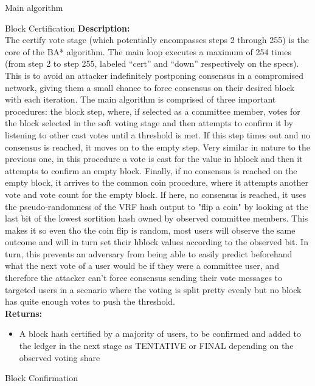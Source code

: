 \documentclass[10pt,a4paper]{article}
\begin{document}
\begin{section}{Main algorithm}
\begin{subsection}{Block Certification}
\noindent \textbf{Description:}\\
The certify vote stage (which potentially encompasses steps 2 through 255) is the core of the BA* algorithm.
The main loop executes a maximum of 254 times (from step 2 to step 255, labeled ``cert'' and ``down'' 
respectively on the specs).
This is to avoid an attacker indefinitely postponing consensus in a compromised network, giving them a 
small chance to force consensus on their desired block with each iteration.
The main algorithm is comprised of three important procedures: the block step, where, if selected as a 
committee member, votes for the block selected in the soft voting stage and then attempts to confirm it 
by listening to other cast votes until a threshold is met.
If this step times out and no consensus is reached, it moves on to the empty step. Very similar in nature 
to the previous one, in this procedure a vote is cast for the value in hblock and then it attempts to 
confirm an empty block.
Finally, if no consensus is reached on the empty block, it arrives to the common coin procedure, where 
it attempts another vote and vote count for the empty block. If here, no consensus is reached, it uses 
the pseudo-randomness of the VRF hash output to "flip a coin" by looking at the last bit of the lowest 
sortition hash owned by observed committee members.
This makes it so even tho the coin flip is random, most users will observe the same outcome and will 
in turn set their hblock values according to the observed bit. In turn, this prevents an adversary 
from being able to easily predict beforehand what the next vote of a user would be if they were a 
committee user, and therefore the attacker can't force consensus 
sending their vote messages to targeted users in a scenario where the voting is split pretty evenly 
but no block has quite enough votes to push the threshold.\\

\noindent \textbf{Returns:}
\begin{itemize}
    \item A block hash certified by a majority of users, to be confirmed and added to the ledger in the next stage as TENTATIVE or FINAL depending
    on the observed voting share
  \end{itemize}


\end{subsection}
\begin{subsection}{Block Confirmation}


\end{subsection}
\end{section}
\end{document}
